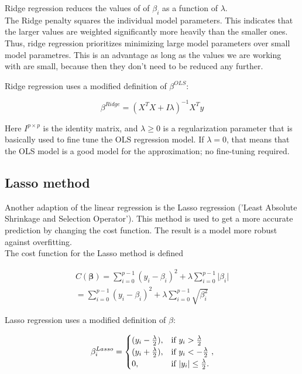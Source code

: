 \documentclass[reprint,english,notitlepage]{revtex4-1}  %
\begin{document}
Ridge regression reduces the values of of $\beta_i$  as a function of $\lambda$. \\ The Ridge penalty squares the individual model parameters. This indicates that the larger values are weighted significantly more heavily than the smaller ones. Thus, ridge regression prioritizes minimizing large model parameters over small model parametres. This is an advantage as long as the values we are working with are small, because then they don’t need to be reduced any further. 



Ridge regression uses a modified definition of $\beta^{OLS}$:


\begin{equation}\label{eq:ridge}
    \beta^{Ridge} = (X^TX + I\lambda)^{-1}X^Ty
\end{equation}


Here $I^{p \times p}$ is the identity matrix, and $\lambda \geq 0$ is a regularization parameter that is basically used to fine tune the OLS regression model. If $\lambda = 0$, that means that the OLS model is a good model for the approximation; no fine-tuning required. \\





\subsection{Lasso method}

Another adaption of the linear regression is the Lasso regression ('Least Absolute Shrinkage and Selection Operator'). This method is used to get a more accurate prediction by changing the cost function. The result is a model more robust against overfitting. \\

The cost function for the Lasso method is defined

\begin{align}
    C(\boldsymbol{\beta})=\sum_{i=0}^{p-1}(y_i-\beta_i)^2+\lambda\sum_{i=0}^{p-1}\vert\beta_i\vert \\ =\sum_{i=0}^{p-1}(y_i-\beta_i)^2+\lambda\sum_{i=0}^{p-1}\sqrt{\beta_i^2}
\end{align}





Lasso regression uses a modified definition of $\beta$:

$$\beta^{Lasso}_i = \begin{cases}
    (y_i - \frac{\lambda}{2}), & \text{if  } y_i > \frac{\lambda}{2}\\
    (y_i + \frac{\lambda}{2}), & \text{if  } y_i < -\frac{\lambda}{2}\\ 
    0, & \text{if  } \abs{y_i} \leq \frac{\lambda}{2}.
\end{cases},$$
\end{document}
